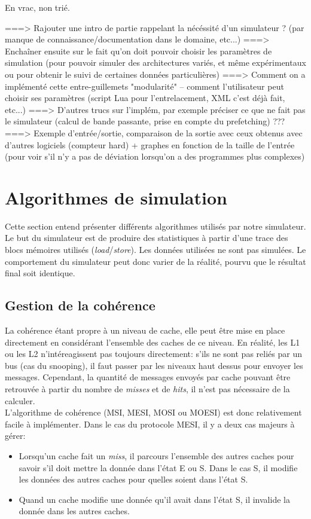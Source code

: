 
En vrac, non trié.

===> Rajouter une intro de partie rappelant la nécéssité d'un simulateur ? (par manque de connaissance/documentation dans le domaine, etc...)
===> Enchaîner ensuite sur le fait qu'on doit pouvoir choisir les paramètres de simulation (pour pouvoir simuler des architectures variés, et même expérimentaux ou pour obtenir le suivi de certaines données particulières)
===> Comment on a implémenté cette entre-guillemets "modularité" -- comment l'utilisateur peut choisir ses paramètres (script Lua pour l'entrelacement, XML c'est déjà fait, etc...)
===> D'autres trucs sur l'implém, par exemple préciser ce que ne fait pas le simulateur (calcul de bande passante, prise en compte du prefetching) ???
===> Exemple d'entrée/sortie, comparaison de la sortie avec ceux obtenus avec d'autres logiciels (compteur hard) + graphes en fonction de la taille de l'entrée (pour voir s'il n'y a pas de déviation lorsqu'on a des programmes plus complexes)

\section{Algorithmes de simulation}
Cette section entend présenter différents algorithmes utilisés par notre simulateur. Le but du simulateur est de produire des statistiques à partir d'une trace des blocs mémoires utilisés (\textit{load}/\textit{store}). Les données utilisées ne sont pas simulées. Le comportement du simulateur peut donc varier de la réalité, pourvu que le résultat final soit identique.

\subsection{Gestion de la cohérence}
La cohérence étant propre à un niveau de cache, elle peut être mise en place directement en considérant l'ensemble des caches de ce niveau. En réalité, les L1 ou les L2 n'intéreagissent pas toujours directement: s'ils ne sont pas reliés par un bus (cas du snooping), il faut passer par les niveaux haut dessus pour envoyer les messages. Cependant, la quantité de messages envoyés par cache pouvant être retrouvée à partir du nombre de \textit{misses} et de \textit{hits}, il n'est pas nécessaire de la calculer. \\

L'algorithme de cohérence (MSI, MESI, MOSI ou MOESI) est donc relativement facile à implémenter. Dans le cas du protocole MESI, il y a deux cas majeurs à gérer: \\
\begin{itemize}
\item Lorsqu'un cache fait un \textit{miss}, il parcours l'ensemble des autres caches pour savoir s'il doit mettre la donnée dans l'état E ou S. Dans le cas S, il modifie les données des autres caches pour quelles soient dans l'état S.
\item Quand un cache modifie une donnée qu'il avait dans l'état S, il invalide la donnée dans les autres caches.
\end{itemize}

